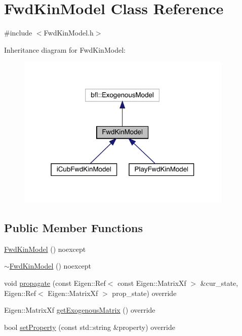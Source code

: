 \hypertarget{classFwdKinModel}{}\section{Fwd\+Kin\+Model Class Reference}
\label{classFwdKinModel}


{\ttfamily \#include $<$Fwd\+Kin\+Model.\+h$>$}



Inheritance diagram for Fwd\+Kin\+Model\+:
\nopagebreak
\begin{figure}[H]
\begin{center}
\leavevmode
\includegraphics[width=292pt]{classFwdKinModel__inherit__graph}
\end{center}
\end{figure}
\subsection*{Public Member Functions}
\begin{DoxyCompactItemize}
\item 
\hyperlink{classFwdKinModel_aff57436563440b831b701b7b9633ab9b}{Fwd\+Kin\+Model} () noexcept
\item 
\hyperlink{classFwdKinModel_afb77abf94a9f8b8379b6e71b4ca0f3c1}{$\sim$\+Fwd\+Kin\+Model} () noexcept
\item 
void \hyperlink{classFwdKinModel_a9461ff14a1ae8d05169e8f1c7a6237c7}{propagate} (const Eigen\+::\+Ref$<$ const Eigen\+::\+Matrix\+Xf $>$ \&cur\+\_\+state, Eigen\+::\+Ref$<$ Eigen\+::\+Matrix\+Xf $>$ prop\+\_\+state) override
\item 
Eigen\+::\+Matrix\+Xf \hyperlink{classFwdKinModel_ac8ed4e8a52f5ff33cc158c80c6cf083e}{get\+Exogenous\+Matrix} () override
\item 
bool \hyperlink{classFwdKinModel_ae5515e8bb1ebc936f67851a796b75fe1}{set\+Property} (const std\+::string \&property) override
\end{DoxyCompactItemize}
